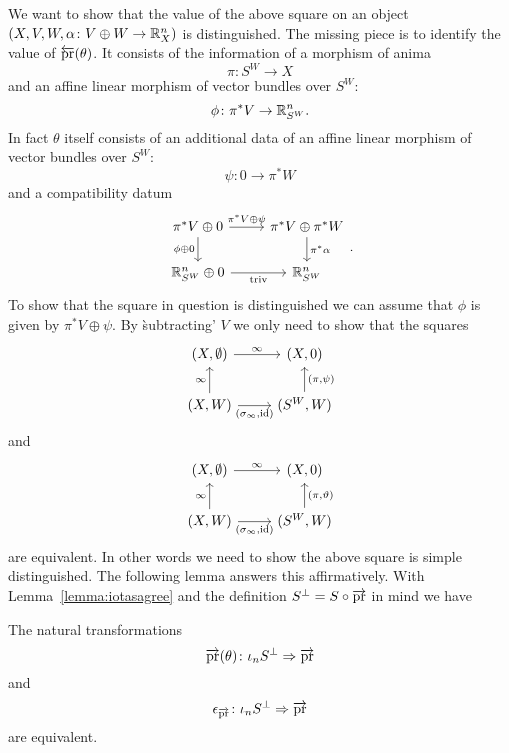 We want to show that the value of the above square on an object $(X,V,W,\alpha \colon V \oplus W \to \mathbb{R}^n_X)$ is distinguished.
The missing piece is to identify the value of $\overleftarrow{\mathrm{pr}}(\theta)$.
It consists of the information of a morphism of anima 
\[
\pi \colon S^W \to X    
\]
and an affine linear morphism of vector bundles over $S^W$:
\[
\phi \colon \pi^*V \to \mathbb{R}^n_{S^W}.    
\]
In fact $\theta$ itself consists of an additional data of 
an affine linear morphism of vector bundles over $S^W$:
\[
\psi \colon 0 \to \pi^*W
\]
and a compatibility datum 
\[\begin{tikzcd}
	{\pi^*V \oplus 0} & {\pi^*V \oplus \pi^*W} \\
	{\R^n_{S^W} \oplus 0} & {\R^n_{S^W}}
	\arrow["{\pi^*V \oplus \psi}", from=1-1, to=1-2]
	\arrow["{\pi^*\alpha}", from=1-2, to=2-2]
	\arrow["{\mathrm{triv}}"', from=2-1, to=2-2]
	\arrow["{\phi\oplus 0}"', from=1-1, to=2-1]
\end{tikzcd}.\]
To show that the square in question is distinguished we
can assume that $\phi$ is given by $\pi^*V \oplus \psi$.
By \`subtracting' $V$ we only need to show that the squares 
\[\begin{tikzcd}
	{(X,\emptyset)} & {(X,0)} \\
	{(X,W)} & {(S^W,W)}
	\arrow["\infty", from=1-1, to=1-2]
	\arrow["{(\sigma_\infty,\id)}"', from=2-1, to=2-2]
	\arrow["\infty", from=2-1, to=1-1]
	\arrow["{(\pi,\psi)}"', from=2-2, to=1-2]
\end{tikzcd}\]
and 
\[\begin{tikzcd}
	{(X,\emptyset)} & {(X,0)} \\
	{(X,W)} & {(S^W,W)}
	\arrow["\infty", from=1-1, to=1-2]
	\arrow["{(\sigma_\infty,\id)}"', from=2-1, to=2-2]
	\arrow["\infty", from=2-1, to=1-1]
	\arrow["{(\pi,\vartheta)}"', from=2-2, to=1-2]
\end{tikzcd}\]
are equivalent. In other words we need to show
the above square is simple distinguished. 
The following lemma answers this affirmatively.
With Lemma~\ref{lemma:iotasagree} and the definition $S^\perp = S\circ \overrightarrow{\mathrm{pr}}$ in mind we have 
\begin{lemma}
    The natural transformations 
    \[
    \overrightarrow{\mathrm{pr}}(\theta)   \colon \iota_n S^\perp \Rightarrow \overrightarrow{\mathrm{pr}} 
    \]
    and 
    \[
    \epsilon_{\overrightarrow{\mathrm{pr}}} \colon \iota_n S^\perp \Rightarrow \overrightarrow{\mathrm{pr}} 
    \]
    are equivalent.
\end{lemma}

